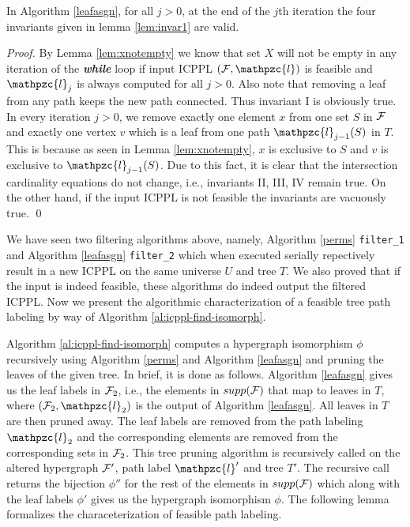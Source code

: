 \documentclass[11pt,letter]{../lib/llncs}
\def\cF{{\cal F}}
\def\cl{\mathpzc{l}}
\def\xnoindent{\noindent} %
\begin{document}
\begin{lemma}
  \label{lem:invar3}
  In Algorithm \ref{leafasgn}, for all $j > 0$, at the end of the
  $j$th iteration the four invariants given in lemma \ref{lem:invar1}
  are valid.
\end{lemma}
\begin{proof}
  By Lemma \ref{lem:xnotempty} we know that set $X$ will not be empty
  in any iteration of the {\em \bf while} loop if input ICPPL $(\cF,
  \cl)$ is feasible and $\cl_j$ is always computed for all $j >
  0$. Also note that removing a leaf from any path keeps the new path
  connected. Thus invariant I is obviously true. In every iteration $j
  > 0$, we remove exactly one element $x$ from one set $S$ in $\cF$
  and exactly one vertex $v$ which is a leaf from one path
  $\cl_{j-1}(S)$ in $T$. This is because as seen in Lemma
  \ref{lem:xnotempty}, $x$ is exclusive to $S$ and $v$ is exclusive to
  $\cl_{j-1}(S)$. Due to this fact, it is clear that the intersection
  cardinality equations do not change, i.e., invariants II, III, IV
  remain true. On the other hand, if the input ICPPL is not feasible
  the invariants are vacuously true. \qed
\end{proof}



\xnoindent We have seen two filtering algorithms above, namely,
Algorithm \ref{perms} {\tt filter\_1} and Algorithm \ref{leafasgn}
{\tt filter\_2} which when executed serially repectively result in a
new ICPPL on the same universe $U$ and tree $T$. We also proved that
if the input is indeed feasible, these algorithms do indeed output the
filtered ICPPL. Now we present the algorithmic characterization of a
feasible tree path labeling by way of Algorithm
\ref{al:icppl-find-isomorph}.

\noindent
Algorithm \ref{al:icppl-find-isomorph} computes a hypergraph
isomorphism $\phi$ recursively using Algorithm \ref{perms} and
Algorithm \ref{leafasgn} and pruning the leaves of the given tree. In
brief, it is done as follows. Algorithm \ref{leafasgn} gives us the
leaf labels in $\cF_2$, i.e., the elements in $supp(\cF)$ that map to
leaves in $T$, where $(\cF_2, \cl_2)$ is the output of Algorithm
\ref{leafasgn}. All leaves in $T$ are then pruned away. The leaf
labels are removed from the path labeling $\cl_2$ and the
corresponding elements are removed from the corresponding sets in
$\cF_2$. This tree pruning algorithm is recursively called on the
altered hypergraph $\cF'$, path label $\cl'$ and tree $T'$. The
recursive call returns the bijection $\phi''$ for the rest of the
elements in $supp(\cF)$ which along with the leaf labels $\phi'$ gives
us the hypergraph isomorphism $\phi$.  The following lemma formalizes
the characeterization of feasible path labeling.
\end{document}
